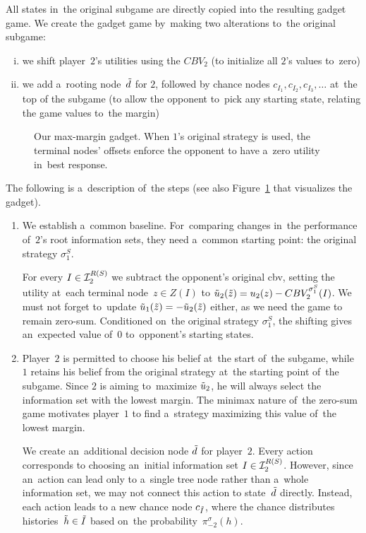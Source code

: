 All states in~the original subgame are directly copied into the resulting gadget game.
We create the gadget game by~making two alterations to~the original subgame:
\begin{enumerate}[(i)]
  \item we shift player~$2$'s utilities using the $CBV_2$ (to initialize all $2$'s values to~zero)
  \item we add a~rooting node~$\tilde{d}$ for $2$, followed by chance nodes $c_{I_1}, c_{I_2}, c_{I_3}, \dots$ at~the top of the subgame (to allow the opponent to~pick any starting state, relating the game values to~the margin)
\end{enumerate}

\begin{figure}[H]
  \centering
  \def\svgwidth{.4\textwidth}
  
  \def\captionTitle{Our max-margin gadget}
  \caption[\captionTitle]{\captionTitle. When $1$'s original strategy is used, the terminal nodes' offsets enforce the opponent to have a~zero utility in~best response.}
  \label{fig:max-margin-gadget}
\end{figure}

The following is a~description of~the steps (see also Figure~\ref{fig:max-margin-gadget} that visualizes the gadget).
\begin{enumerate}
  \item We establish a~common baseline.
    For~comparing changes in~the performance of~$2$'s root information sets, they need a~common starting point:
    the original strategy $\sigma_1^S$.

    For every $I \in \mathcal{I}_2^{R(S)}$ we subtract the opponent's original \acrlong{cbv}, setting the utility at~each terminal node~$z \in Z(I)$ to $\tilde{u}_2(\tilde{z}) = u_2(z) - CBV_2^{\sigma^S_1}(I)$.
    We must not forget to~update $\tilde{u}_1(\tilde{z}) = -\tilde{u}_2(\tilde{z})$ either, as we need the game to remain zero-sum.
    Conditioned on~the original strategy $\sigma_1^S$, the shifting gives an~expected value of~$0$ to~opponent's starting states.

  \item Player~$2$ is permitted to choose his belief at~the start of~the subgame, while $1$ retains his belief from the original strategy at~the starting point of~the subgame.
    Since $2$ is aiming to~maximize $\tilde{u}_2$, he will always select the information set with the lowest margin.
    The minimax nature of~the zero-sum game motivates player~$1$ to find a~strategy maximizing this value of~the lowest margin.

    We create an~additional decision node $\tilde{d}$ for player~$2$.
    Every action corresponds to choosing an~initial information set $I\in \mathcal{I}_2^{R(S)}$.
    However, since an~action can lead only to a~single tree node rather than a~whole information set, we may not connect this action to state~$\tilde{d}$ directly.
    Instead, each action leads to a new chance node $c_{\tilde{I}}$, where the chance distributes histories~$\tilde{h} \in \tilde{I}$ based on~the probability~$\pi_{-2}^\sigma (h)$.

    \todo
\end{enumerate}

